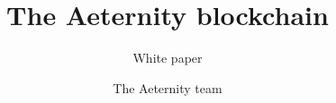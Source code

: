 \documentclass{paper}
\begin{document}
%
\title{The Aeternity blockchain}
\subtitle{White paper}

\author{The Aeternity team}

\maketitle

%

\end{document}
